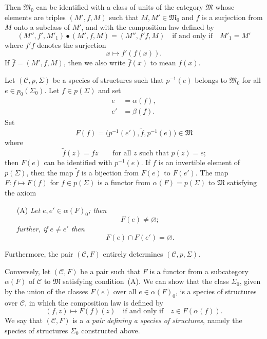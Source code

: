 \documentclass[a4paper,fleqn]{article}
\theoremstyle{plain}
\theoremstyle{definition}
\newcommand{\oldpage}[1]{{\marginpar{\footnotesize$\bigg\vert$\,\,\,\,\textit{p.~#1}}}}
\newcommand{\CC}{\mathcal{C}}
\newcommand{\MM}{\mathfrak{M}}
\begin{document}
Then $\MM_0$ can be identified with a class of units of the category $\MM$ whose elements are triples $(M',f,M)$ such that $M,M'\in\MM_0$ and $f$ is a surjection from $M$ onto a subclass of $M'$, and with the composition law defined by
\[
  (M'',f',M'_1)\bullet(M',f,M)
  = (M'',f'f,M)
  \quad\text{if and only if}\quad
  M'_1=M'
\]
where $f'f$ denotes the surjection
\[
  x\longmapsto f'(f(x)).
\]
If $\bar{f}=(M',f,M)$, then we also write $\bar{f}(x)$ to mean $f(x)$.

Let $(\CC,p,\Sigma)$ be a species of structures such that $p^{-1}(e)$ belongs to $\MM_0$ for all $e\in p_0(\Sigma_0)$.
Let $f\in p(\Sigma)$ and set
\[
  \begin{aligned}
    e&=\alpha(f),
  \\e'&=\beta(f).
  \end{aligned}
\]
Set
\[
  F(f)
  = \big(p^{-1}(e'),\widetilde{f},p^{-1}(e)\big)
  \in\MM
\]
\oldpage{353}
where
\[
  \widetilde{f}(z)
  =fz
  \qquad\text{for all $z$ such that $p(z)=e$;}
\]
then $F(e)$ can be identified with $p^{-1}(e)$.
If $f$ is an invertible element of $p(\Sigma)$, then the map $\widetilde{f}$ is a bijection from $F(e)$ to $F(e')$.
The map $F\colon f\mapsto F(f)$ for $f\in p(\Sigma)$ is a functor from $\alpha(F)=p(\Sigma)$ to $\MM$ satisfying the axiom
\begin{enumerate}
  \item[(A)] \itshape
    Let $e,e'\in\alpha(F)_0$; then
    \[
      F(e)\neq\varnothing;
    \]
    further, if $e\neq e'$ then
    \[
      F(e)\cap F(e')=\varnothing.
    \]
\end{enumerate}
Furthermore, the pair $(\CC,F)$ entirely determines $(\CC,p,\Sigma)$.

Conversely, let $(\CC,F)$ be a pair such that $F$ is a functor from a subcategory $\alpha(F)$ of $\CC$ to $\MM$ satisfying condition~(A).
We can show \cite{3a} that the class $\Sigma_0$, given by the union of the classes $F(e)$ over all $e\in\alpha(F)_0$, is a species of structures over $\CC$, in which the composition law is defined by
\[
  (f,z)\longmapsto F(f)(z)
  \quad\text{if and only if}\quad
  z\in F(\alpha(f)).
\]
We say that $(\CC,F)$ is a \emph{a pair defining a species of structures}, namely the species of structures $\Sigma_0$ constructed above.
\end{document}
